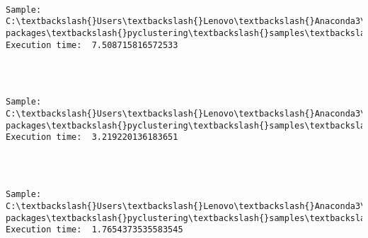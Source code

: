 \documentclass[11pt]{article}
\begin{document}
    \begin{center}
    \end{center}
    { \hspace*{\fill} \\}
    
    \begin{Verbatim}[commandchars=\\\{\}]
Sample:  C:\textbackslash{}Users\textbackslash{}Lenovo\textbackslash{}Anaconda3\textbackslash{}lib\textbackslash{}site-packages\textbackslash{}pyclustering\textbackslash{}samples\textbackslash{}samples\textbackslash{}fcps\textbackslash{}EngyTime.data 		Execution time:  7.508715816572533 


    \end{Verbatim}

    \begin{center}
    \end{center}
    { \hspace*{\fill} \\}
    
    \begin{Verbatim}[commandchars=\\\{\}]
Sample:  C:\textbackslash{}Users\textbackslash{}Lenovo\textbackslash{}Anaconda3\textbackslash{}lib\textbackslash{}site-packages\textbackslash{}pyclustering\textbackslash{}samples\textbackslash{}samples\textbackslash{}fcps\textbackslash{}GolfBall.data 		Execution time:  3.219220136183651 


    \end{Verbatim}

    \begin{center}
    \end{center}
    { \hspace*{\fill} \\}
    
    \begin{Verbatim}[commandchars=\\\{\}]
Sample:  C:\textbackslash{}Users\textbackslash{}Lenovo\textbackslash{}Anaconda3\textbackslash{}lib\textbackslash{}site-packages\textbackslash{}pyclustering\textbackslash{}samples\textbackslash{}samples\textbackslash{}fcps\textbackslash{}Lsun.data 		Execution time:  1.7654373535583545 


    \end{Verbatim}
\end{document}
